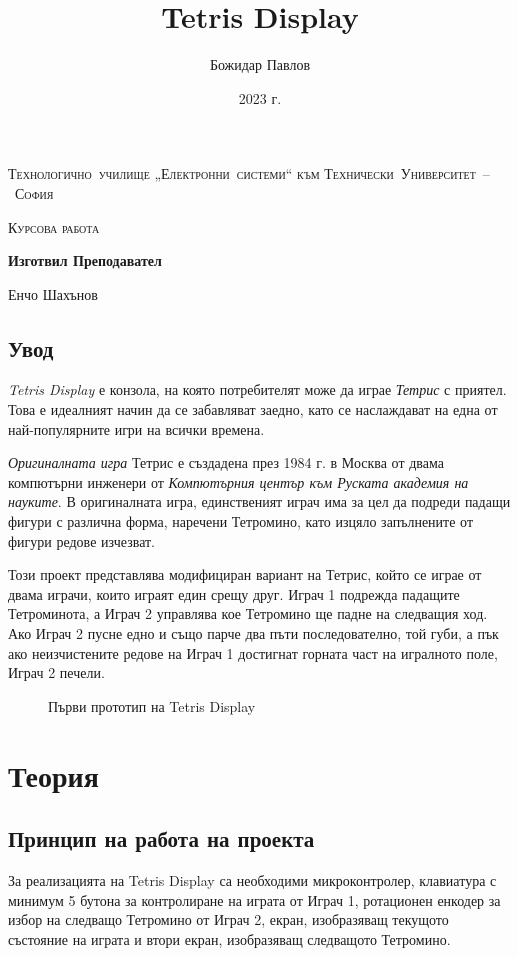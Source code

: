 \documentclass[titlepage, oneside, 14pt]{extbook}
\author{Божидар Павлов}
\title{Tetris Display}
\date{2023 г.}
\renewcommand{\texttt}[1]{{\small\ttfamily #1}}
\renewcommand{\maketitle}
{
    \begin{titlepage}
        \centering
        {\large\scshape Технологично~училище „Електронни~системи“ към Технически~Университет~–~София\par}
        \vfill
        {\LARGE\scshape\mdseries Курсова работа\par}
        \vspace{1cm}
        {\Huge\bfseries\thetitle\par}
        \vfill
        {\large\bfseries Изготвил \hfill Преподавател\par}
        {\Large\theauthor \hfill Енчо Шахънов\par}
        \vspace{1cm}
        {\large\thedate\par}
    \end{titlepage}
}
\begin{document}
\maketitle

\setcounter{page}{2}

\section*{Увод}

\textit{Tetris Display} е конзола, на която потребителят може да играе
\textit{Тетрис} с приятел. Това е идеалният начин да се забавляват заедно, като се
наслаждават на една от най-популярните игри на всички времена.

\textit{Оригиналната игра} Тетрис е създадена през 1984 г. в Москва от двама компютърни инженери от
\textit{Компютърния център към Руската академия на науките}. В оригиналната игра,
единственият играч има за цел да подреди падащи фигури с различна форма,
наречени Тетромино, като изцяло запълнените от фигури редове изчезват.

Този проект представлява модифициран вариант на Тетрис, който се играе от двама играчи,
които играят един срещу друг. Играч 1 подрежда падащите Тетроминота, а Играч 2 управлява кое Тетромино
ще падне на следващия ход. Ако Играч 2 пусне
едно и също парче два пъти последователно, той губи, а пък ако неизчистените редове на Играч 1 достигнат горната част на игралното поле, Играч 2 печели.
\vfill

\begin{figure}[!htbp]
    \centering
    \texttt{[image: img/prototype1.png]}
    \caption{Първи прототип на \textmd{Tetris Display}}
\end{figure}

\chapter{Теория}

\section{Принцип на работа на проекта}

За реализацията на \textmd{Tetris Display} са необходими микроконтролер,
клавиатура с минимум 5 бутона за контролиране на играта от Играч 1,
ротационен енкодер за избор на следващо Тетромино от Играч 2, екран, изобразяващ текущото
състояние на играта и втори екран, изобразяващ следващото Тетромино.
\end{document}
